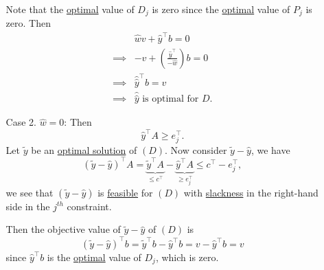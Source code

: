 \begin{explanation}
\begin{enumerate}
\begin{enumerate}
				      Note that the \hyperref[def:optimal-solution]{optimal} value of \(D_{j}\) is zero since the \hyperref[def:optimal-solution]{optimal} value of \(P_{j}\) is zero. Then
				      \[
					      \begin{split}
						      &\hat{w} v + \hat{y}^{\top}b = 0\\
						      \implies& -v + \left( \frac{\hat{y}^{\top}}{-\hat{w}} \right) b = 0\\
						      \implies& \hat{\hat{y}}^{\top}b = v\\
						      \implies& \hat{\hat{y}} \text{ is optimal for }D.
					      \end{split}
				      \]
			      \item[Case 2.] \(\hat{w} = 0\): Then
				      \[
					      \hat{y}^{\top}A\geq e_{j}^{\top}.
				      \]
				      Let \(\widetilde{y}\) be an \hyperref[def:optimal-solution]{optimal solution} of \((D)\). Now consider \(\widetilde{y} - \hat{y}\), we have
				      \[
					      \left(\widetilde{y} - \hat{y}\right)^{\top}A = \underbrace{\widetilde{y}^{\top}A}_{\leq c^{\top}} - \underbrace{\hat{y}^{\top}A}_{\geq e_{j}^{\top}} \leq c^{\top} - e_{j}^{\top},
				      \]
				      we see that \(\left( \widetilde{y} - \hat{y} \right) \) is \hyperref[def:feasible-solution]{feasible} for \((D)\) with \hyperref[def:slack-variable]{slackness}
				      in the right-hand side in the \(j^{th}\) constraint.

				      Then the objective value of \(\widetilde{y}-\hat{y}\) of \((D)\) is
				      \[
					      \left( \widetilde{y}-\hat{y} \right)^{\top}b = \widetilde{y}^{\top}b - \hat{y}^{\top}b = v - \hat{y}^{\top}b = v
				      \]
				      since \(\hat{y}^{\top}b\) is the \hyperref[def:optimal-solution]{optimal} value of \(D_{j}\), which is zero.
		      \end{enumerate}
	\end{enumerate}


\end{explanation}
